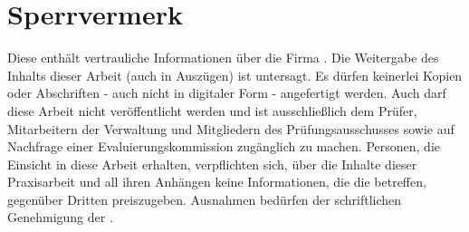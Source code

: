\section*{Sperrvermerk}

Diese \documentType{} enthält vertrauliche Informationen über die Firma \assosiatedCompany. 
Die Weitergabe des Inhalts dieser Arbeit (auch in Auszügen) ist untersagt. 
Es dürfen keinerlei Kopien oder Abschriften - auch nicht in digitaler Form - angefertigt werden. 
Auch darf diese Arbeit nicht veröffentlicht werden und ist 
ausschließlich dem Prüfer, Mitarbeitern der Verwaltung und Mitgliedern des Prüfungsausschusses sowie auf Nachfrage einer Evaluierungskommission zugänglich zu machen. 
Personen, die Einsicht in diese Arbeit erhalten, verpflichten sich, über die Inhalte dieser Praxisarbeit und all ihren Anhängen keine Informationen, 
die die \assosiatedCompany{} betreffen, gegenüber Dritten preiszugeben. Ausnahmen bedürfen der schriftlichen Genehmigung der \assosiatedCompany.
\newpage
